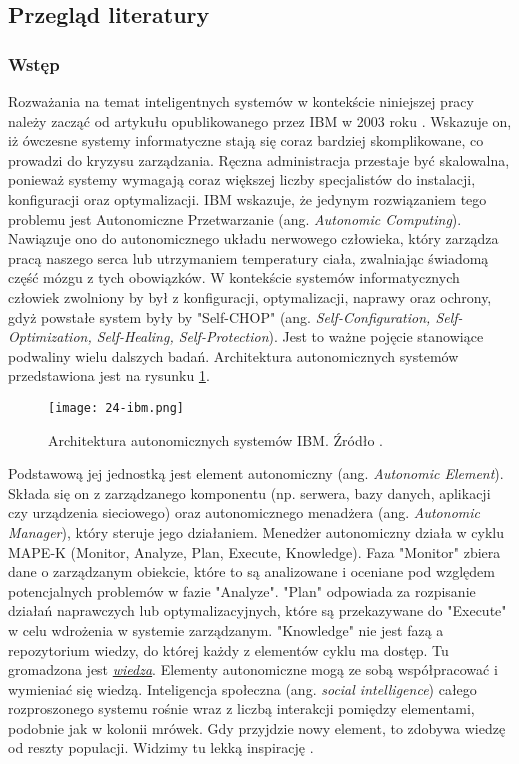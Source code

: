 \subsection{Przegląd literatury}
\subsubsection{Wstęp}
Rozważania na temat inteligentnych systemów w kontekście niniejszej pracy należy zacząć od artykułu opublikowanego przez IBM w 2003 roku \cite{kephart2003}. Wskazuje on, iż ówczesne systemy informatyczne stają się coraz bardziej skomplikowane, co prowadzi do kryzysu zarządzania. Ręczna administracja przestaje być skalowalna, ponieważ systemy wymagają coraz większej liczby specjalistów do instalacji, konfiguracji oraz optymalizacji. IBM wskazuje, że jedynym rozwiązaniem tego problemu jest Autonomiczne Przetwarzanie (ang. \textit{Autonomic Computing}). Nawiązuje ono do autonomicznego układu nerwowego człowieka, który zarządza pracą naszego serca lub utrzymaniem temperatury ciała, zwalniając świadomą część mózgu z tych obowiązków. W kontekście systemów informatycznych człowiek zwolniony by był z konfiguracji, optymalizacji, naprawy oraz ochrony, gdyż powstałe system były by "Self-CHOP" (ang. \textit{Self-Configuration, Self-Optimization, Self-Healing, Self-Protection}). Jest to ważne pojęcie stanowiące podwaliny wielu dalszych badań. Architektura autonomicznych systemów przedstawiona jest na rysunku \ref{fig:24-ibm}.

\begin{figure}[!htbp]
    \centering \texttt{[image: 24-ibm.png]}
    \caption{Architektura autonomicznych systemów IBM. Źródło \cite{kephart2003}.}\label{fig:24-ibm}
\end{figure}

Podstawową jej jednostką jest element autonomiczny (ang. \textit{Autonomic Element}). Składa się on z zarządzanego komponentu (np. serwera, bazy danych, aplikacji czy urządzenia sieciowego) oraz autonomicznego menadżera (ang. \textit{Autonomic Manager}), który steruje jego działaniem. Menedżer autonomiczny działa w cyklu MAPE-K (Monitor, Analyze, Plan, Execute, Knowledge). Faza "Monitor" zbiera dane o zarządzanym obiekcie, które to są analizowane i oceniane pod względem potencjalnych problemów w fazie "Analyze". "Plan" odpowiada za rozpisanie działań naprawczych lub optymalizacyjnych, które są przekazywane do "Execute" w celu wdrożenia w systemie zarządzanym. "Knowledge" nie jest fazą a repozytorium wiedzy, do której każdy z elementów cyklu ma dostęp. Tu gromadzona jest \hyperlink{def:wiedza}{\textit{wiedza}}. Elementy autonomiczne mogą ze sobą współpracować i wymieniać się wiedzą. Inteligencja społeczna (ang. \textit{social intelligence}) całego rozproszonego systemu rośnie wraz z liczbą interakcji pomiędzy elementami, podobnie jak w kolonii mrówek. Gdy przyjdzie nowy element, to zdobywa wiedzę od reszty populacji. Widzimy tu lekką inspirację \cite{minsky1986}.

